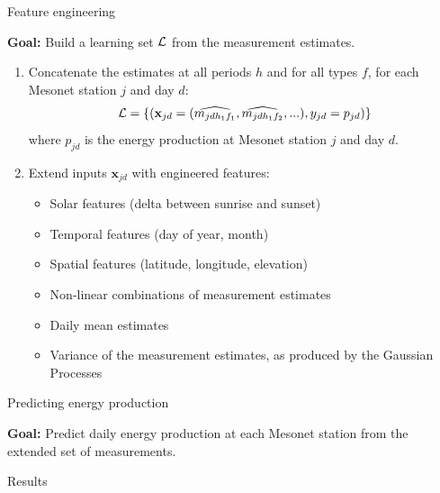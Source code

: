 \documentclass[handout]{beamer}
\begin{document}
\begin{frame}{Feature engineering}

\textbf{Goal:} Build a learning set ${\cal L}$ from the measurement estimates.

\begin{enumerate}

\item Concatenate the estimates at all periods $h$ and for all types $f$, for
each Mesonet station $j$ and day $d$:
$${\cal L} = \{ (\mathbf{x}_{jd} = (\widehat{m_{jd{h_1}{f_1}}}, \widehat{m_{jd{h_1}{f_2}}}, ...), y_{jd} = p_{jd}) \}$$
where $p_{jd}$ is the energy production at Mesonet station $j$ and day $d$.

\item Extend inputs $\mathbf{x}_{jd}$ with engineered features:
\begin{itemize}
\item Solar features (delta between sunrise and sunset)
\item Temporal features (day of year, month)
\item Spatial features (latitude, longitude, elevation)
\item Non-linear combinations of measurement estimates
\item Daily mean estimates
\item Variance of the measurement estimates, as produced by the Gaussian Processes
\end{itemize}

\end{enumerate}

\end{frame}



\begin{frame}{Predicting energy production}

\textbf{Goal:} Predict daily energy production at each Mesonet station from the
extended set of measurements.


\end{frame}



\begin{frame}{Results}

\end{frame}
\end{document}
